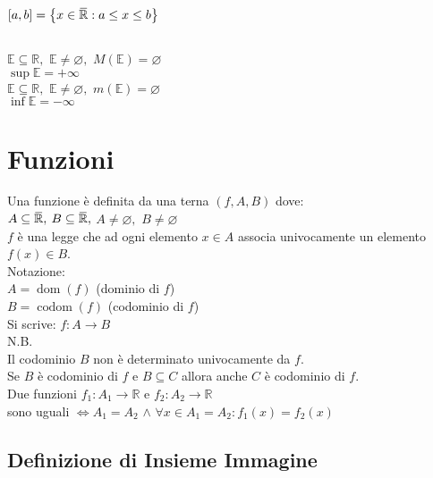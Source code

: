 \documentclass[a4paper, twoside, italian, 11pt]{book}
\newcommand{\braces}[1] {\left \{ #1 \right \}}
\newcommand{\overbar}[1] {\mkern 1.5mu\overline{\mkern-1.5mu#1\mkern-1.5mu}\mkern 1.5mu}
\DeclareMathOperator{\dom}{dom}
\DeclareMathOperator{\codom}{codom}
\newcommand{\R}{\mathbb{R}}
\newcommand{\E}{\mathbb{E}}
\let\emptyset\varnothing
\begin{document}
\noindent
$[a, b] = \braces{ x \in \overbar\R : a \leq x \leq b}$ \\


\subsection{}

\noindent
$\E \subseteq \R,$ $\E \neq \emptyset,$ $M(\E) = \emptyset$ \\
$\sup \E = +\infty$ \\

\noindent
$\E \subseteq \R,$ $\E \neq \emptyset,$ $m(\E) = \emptyset$ \\
$\inf \E = -\infty$



\section{Funzioni}

\noindent
Una funzione è definita da una terna $(f, A, B)$ dove: \\

\noindent
$A \subseteq \overbar\R,$ $B \subseteq \overbar\R,$ $A \neq \emptyset,$ $B \neq \emptyset$ \\
$f$ è una legge che ad ogni elemento $x \in A$ associa univocamente un elemento $f(x) \in B$. \\

\noindent
Notazione: \\
$A = \dom(f)$ (dominio di $f$) \\
$B = \codom(f)$ (codominio di $f$) \\

\noindent
Si scrive: $f : A \rightarrow B$ \\

\noindent
N.B. \\
Il codominio $B$ non è determinato univocamente da $f$. \\
Se $B$ è codominio di $f$ e $B \subseteq C$ allora anche $C$ è codominio di $f$. \\

\noindent
Due funzioni $f_1 : A_1 \rightarrow \R$ e $f_2 : A_2 \rightarrow \R$ \\
sono uguali $\iff A_1 = A_2$ $\land$ $\forall x \in A_1 = A_2 : f_1(x) = f_2(x)$


\subsection{Definizione di Insieme Immagine}
\end{document}
